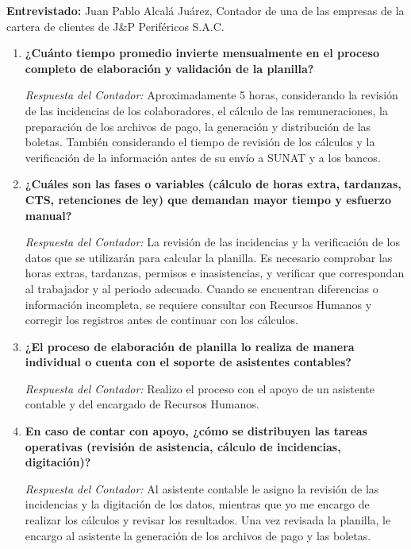 \vspace{0.3cm}
\noindent\textbf{Entrevistado:} Juan Pablo Alcalá Juárez, Contador de una de las empresas de la cartera de clientes de J\&P Periféricos S.A.C.
\vspace{0.4cm}

\begin{enumerate}[leftmargin=*, label=\textbf{P\arabic*.}]
    \item \textbf{¿Cuánto tiempo promedio invierte mensualmente en el proceso completo de elaboración y validación de la planilla?}
    
    \textit{Respuesta del Contador:} Aproximadamente 5 horas, considerando la revisión de las incidencias de los colaboradores, el cálculo de las remuneraciones, la preparación de los archivos de pago, la generación y distribución de las boletas. 
    También considerando el tiempo de revisión de los cálculos y la verificación de la información antes de su envío a SUNAT y a los bancos.

    \item \textbf{¿Cuáles son las fases o variables (cálculo de horas extra, tardanzas, CTS, retenciones de ley) que demandan mayor tiempo y esfuerzo manual? }
    
    \textit{Respuesta del Contador:} La revisión de las incidencias y la verificación de los datos que se utilizarán para calcular la planilla. Es necesario comprobar las horas extras, tardanzas, 
    permisos e inasistencias, y verificar que correspondan al trabajador y al periodo adecuado. 
    Cuando se encuentran diferencias o información incompleta, se requiere consultar con Recursos Humanos y corregir los registros antes de continuar con los cálculos.
    
    \item \textbf{¿El proceso de elaboración de planilla lo realiza de manera individual o cuenta con el soporte de asistentes contables?}
    
    \textit{Respuesta del Contador:} Realizo el proceso con el apoyo de un asistente contable y del encargado de Recursos Humanos.

    \item \textbf{En caso de contar con apoyo, ¿cómo se distribuyen las tareas operativas (revisión de asistencia, cálculo de incidencias, digitación)? }
    
    \textit{Respuesta del Contador:} Al asistente contable le asigno la revisión de las incidencias y la digitación de los datos, 
    mientras que yo me encargo de realizar los cálculos y revisar los resultados. 
    Una vez revisada la planilla, le encargo al asistente la generación de los archivos de pago y las boletas.


\end{enumerate}
